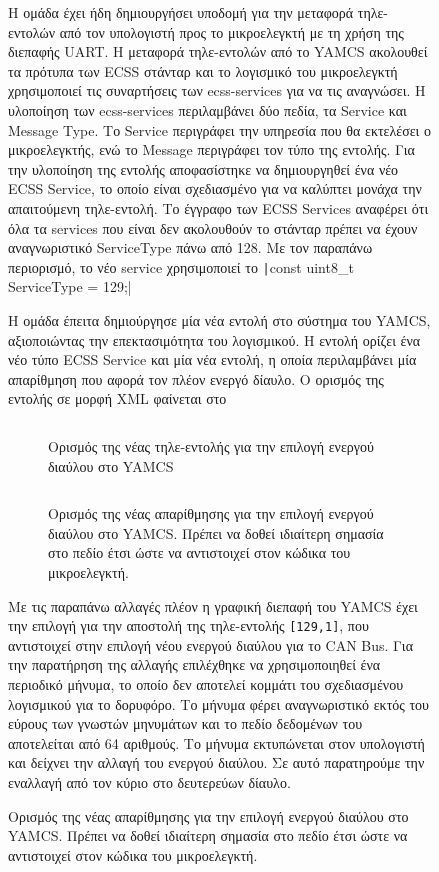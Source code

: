 \documentclass[a4paper,nobib,justified]{tufte-book}
\begin{document}
\begin{figure}
Η ομάδα έχει ήδη δημιουργήσει υποδομή για την μεταφορά τηλε-εντολών από τον υπολογιστή προς το μικροελεγκτή με τη χρήση της διεπαφής UART. Η μεταφορά τηλε-εντολών από το YAMCS ακολουθεί τα πρότυπα των ECSS στάνταρ και το λογισμικό του μικροελεγκτή χρησιμοποιεί τις συναρτήσεις των ecss-services για να τις αναγνώσει. Η υλοποίηση των ecss-services περιλαμβάνει δύο πεδία, τα Service και Message Type. Το Service περιγράφει την υπηρεσία που θα εκτελέσει ο μικροελεγκτής, ενώ το Message περιγράφει τον τύπο της εντολής. Για την υλοποίηση της εντολής αποφασίστηκε να δημιουργηθεί ένα νέο ECSS Service, το οποίο είναι σχεδιασμένο για να καλύπτει μονάχα την απαιτούμενη τηλε-εντολή. Το έγγραφο των ECSS Services  αναφέρει ότι όλα τα services που είναι δεν ακολουθούν το στάνταρ πρέπει να έχουν αναγνωριστικό ServiceType πάνω από 128. Με τον παραπάνω περιορισμό, το νέο service χρησιμοποιεί το \texttt|const uint8_t ServiceType = 129;|

Η ομάδα έπειτα δημιούργησε μία νέα εντολή στο σύστημα του YAMCS, αξιοποιώντας την επεκτασιμότητα του λογισμικού. Η εντολή ορίζει ένα νέο τύπο ECSS Service και μία νέα εντολή, η οποία περιλαμβάνει μία απαρίθμηση που αφορά τον πλέον ενεργό δίαυλο. Ο ορισμός της εντολής σε μορφή XML φαίνεται στο 

\begin{figure}[h]
	\inputminted{xml}{code/examples/yamcs-129,1.xml}
	\label{code:yamcs-xml}
	\caption[Ορισμός νέας τηλε-εντολής στο YAMCS]{Ορισμός της νέας τηλε-εντολής για την επιλογή ενεργού διαύλου στο YAMCS}
\end{figure}

\begin{figure}[h]
	\inputminted{xml}{code/examples/yamcs-enumeration.xml}
	\label{code:yamcs-enumeration}
	\caption[Ορισμός της απαρίθμησης στο YAMCS]{Ορισμός της νέας απαρίθμησης για την επιλογή ενεργού διαύλου στο YAMCS. Πρέπει να δοθεί ιδιαίτερη σημασία στο πεδίο έτσι ώστε να αντιστοιχεί στον κώδικα του μικροελεγκτή.}
\end{figure}

Με τις παραπάνω αλλαγές πλέον η γραφική διεπαφή του YAMCS έχει την επιλογή για την αποστολή της τηλε-εντολής \texttt{[129,1]}, που αντιστοιχεί στην επιλογή νέου ενεργού διαύλου για το CAN Bus. Για την  παρατήρηση της αλλαγής επιλέχθηκε να χρησιμοποιηθεί ένα περιοδικό μήνυμα, το οποίο δεν αποτελεί κομμάτι του σχεδιασμένου λογισμικού για το δορυφόρο. Το μήνυμα φέρει αναγνωριστικό εκτός του εύρους των γνωστών μηνυμάτων και το πεδίο δεδομένων του αποτελείται από 64 αριθμούς. Το μήνυμα εκτυπώνεται στον υπολογιστή και δείχνει την αλλαγή του ενεργού διαύλου. Σε αυτό παρατηρούμε την εναλλαγή από τον κύριο στο δευτερεύων δίαυλο.


\end{figure}
\end{document}
